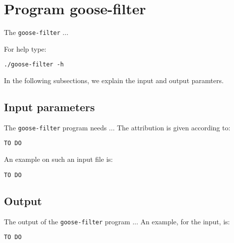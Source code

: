 \section{Program goose-filter}
The \texttt{goose-filter} ...

For help type:
\begin{lstlisting}
./goose-filter -h
\end{lstlisting}
In the following subsections, we explain the input and output paramters.

\subsection*{Input parameters}

The \texttt{goose-filter} program needs ...
The attribution is given according to:
\begin{lstlisting}
TO DO
\end{lstlisting}

An example on such an input file is:
\begin{lstlisting}
TO DO
\end{lstlisting}

\subsection*{Output}
The output of the \texttt{goose-filter} program ...
An example, for the input, is:
\begin{lstlisting}
TO DO
\end{lstlisting}
